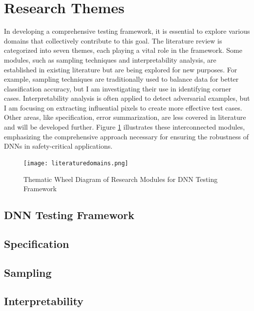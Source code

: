 \section{Research Themes}
In developing a comprehensive testing framework, it is essential to explore various domains that collectively contribute to this goal. The literature review is categorized into seven themes, each playing a vital role in the framework. Some modules, such as sampling techniques and interpretability analysis, are established in existing literature but are being explored for new purposes. For example, sampling techniques are traditionally used to balance data for better classification accuracy, but I am investigating their use in identifying corner cases. Interpretability analysis is often applied to detect adversarial examples, but I am focusing on extracting influential pixels to create more effective test cases. Other areas, like specification, error summarization, are less covered in literature and will be developed further. Figure \ref{fig:thematic_wheel} illustrates these interconnected modules, emphasizing the comprehensive approach necessary for ensuring the robustness of DNNs in safety-critical applications. 

\begin{figure}[h]
  \centering
  \texttt{[image: literaturedomains.png]}
  \caption{Thematic Wheel Diagram of Research Modules for DNN Testing Framework}
  \label{fig:thematic_wheel}
\end{figure}

\subsection{DNN Testing Framework}

\subsection{Specification}

\subsection{Sampling}

\subsection{Interpretability}

